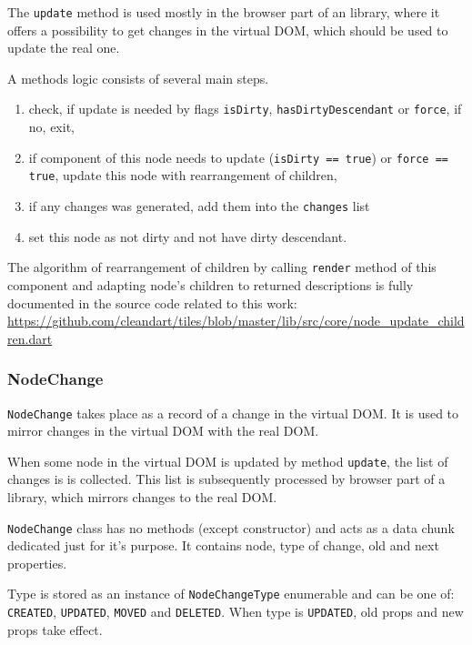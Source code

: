 \documentclass[oneside, 12pt]{book}
\begin{document}
      The \texttt{update} method is used mostly in the browser part of an library, where it offers a possibility to get changes in the virtual DOM, which should be used to update the real one. 

      A methods logic consists of several main steps.
      \begin{enumerate}
        \item check, if update is needed by flags \texttt{isDirty}, \texttt{hasDirtyDescendant} or \texttt{force}, if no, exit,
        \item if component of this node needs to update (\texttt{isDirty == true}) or \texttt{force == true}, update this node with rearrangement of children,
        \item if any changes was generated, add them into the \texttt{changes} list
        \item set this node as not dirty and not have dirty descendant.
      \end{enumerate}

      The algorithm of rearrangement of children by calling \texttt{render} method of this component 
      and adapting node's children to returned descriptions is fully documented in the source code related to this work: 
      \url{https://github.com/cleandart/tiles/blob/master/lib/src/core/node_update_children.dart}

    \subsubsection{NodeChange}\label{subsubsec:our-architecture-core-node-change}
      \texttt{NodeChange} takes place as a record of a change in the virtual DOM. 
      It is used to mirror changes in the virtual DOM with the real DOM. 

      When some node in the virtual DOM is updated by method \texttt{update}, the list of changes is is collected.
      This list is subsequently processed by browser part of a library, which mirrors changes to the real DOM.

      \texttt{NodeChange} class has no methods (except constructor) and acts as a data chunk dedicated just for it's purpose. 
      It contains node, type of change, old and next properties. 

      Type is stored as an instance of \texttt{NodeChangeType} enumerable and can be one of: \texttt{CREATED}, \texttt{UPDATED}, 
      \texttt{MOVED} and \texttt{DELETED}. 
      When type is \texttt{UPDATED}, old props and new props take effect. 
\end{document}
